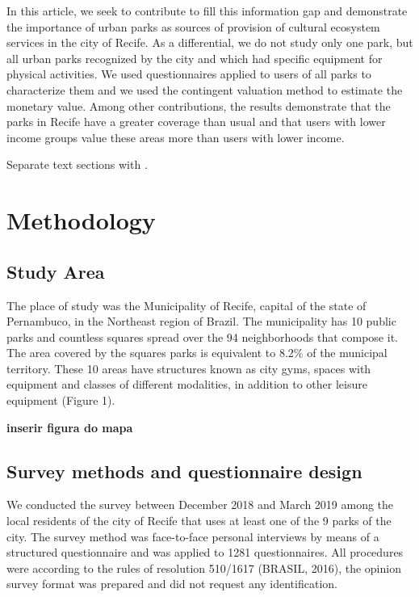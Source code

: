\documentclass[smallextended]{svjour3}       %
\begin{document}
In this article, we seek to contribute to fill this information gap and
demonstrate the importance of urban parks as sources of provision of
cultural ecosystem services in the city of Recife. As a differential, we
do not study only one park, but all urban parks recognized by the city
and which had specific equipment for physical activities. We used
questionnaires applied to users of all parks to characterize them and we
used the contingent valuation method to estimate the monetary value.
Among other contributions, the results demonstrate that the parks in
Recife have a greater coverage than usual and that users with lower
income groups value these areas more than users with lower income.

Separate text sections with \cite{Mislevy06Cog}.

\hypertarget{sec:1}{%
\section{Methodology}\label{sec:1}}

\hypertarget{sec:2}{%
\subsection{Study Area}\label{sec:2}}

The place of study was the Municipality of Recife, capital of the state
of Pernambuco, in the Northeast region of Brazil. The municipality has
10 public parks and countless squares spread over the 94 neighborhoods
that compose it. The area covered by the squares parks is equivalent to
8.2\% of the municipal territory. These 10 areas have structures known
as city gyms, spaces with equipment and classes of different modalities,
in addition to other leisure equipment (Figure 1).

\textbf{inserir figura do mapa}

\hypertarget{survey-methods-and-questionnaire-design}{%
\subsection{Survey methods and questionnaire
design}\label{survey-methods-and-questionnaire-design}}

We conducted the survey between December 2018 and March 2019 among the
local residents of the city of Recife that uses at least one of the 9
parks of the city. The survey method was face-to-face personal
interviews by means of a structured questionnaire and was applied to
1281 questionnaires. All procedures were according to the rules of
resolution 510/1617 (BRASIL, 2016), the opinion survey format was
prepared and did not request any identification.
\end{document}
